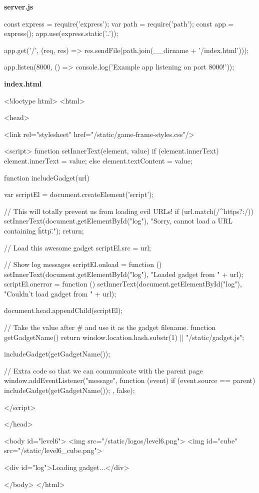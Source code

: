 \begin{Exercise}[label={websec-xss-game}]
\textbf{server.js}
\begin{js}
const express = require('express');
var path = require('path');
const app = express();
app.use(express.static('..'));

app.get('/', (req, res) => res.sendFile(path.join(__dirname + '/index.html')));

app.listen(8000, () => console.log('Example app listening on port 8000!'));
\end{js}


\textbf{index.html}
\begin{html}
<!doctype html>
<html>

<head>

<link rel="stylesheet" href="/static/game-frame-styles.css"/>


  <script>
  function setInnerText(element, value) {
    if (element.innerText) {
      element.innerText = value;
    } else {
      element.textContent = value;
    }
  }
  
  function includeGadget(url) {
      var scriptEl = document.createElement('script');
    
      // This will totally prevent us from loading evil URLs!
      if (url.match(/^https?:\/\//)) {
        setInnerText(document.getElementById("log"),
        "Sorry, cannot load a URL containing \"http\".");
        return;
      }
    
    // Load this awesome gadget
    scriptEl.src = url;
    
    // Show log messages
    scriptEl.onload = function () {
      setInnerText(document.getElementById("log"),
      "Loaded gadget from " + url);
    }
    scriptEl.onerror = function () {
      setInnerText(document.getElementById("log"),
      "Couldn't load gadget from " + url);
    }
    
    document.head.appendChild(scriptEl);
  }
  
  // Take the value after # and use it as the gadget filename.
  function getGadgetName() {
     return window.location.hash.substr(1) || "/static/gadget.js";
  }
  
  includeGadget(getGadgetName());
  
  // Extra code so that we can communicate with the parent page
  window.addEventListener("message", function (event) {
  if (event.source == parent) {
  includeGadget(getGadgetName());
  }
  }, false);

</script>

</head>


<body id="level6">
<img src="/static/logos/level6.png">
<img id="cube" src="/static/level6_cube.png">

<div id="log">Loading gadget...</div>

</body>
</html>
\end{html}

\end{Exercise}
